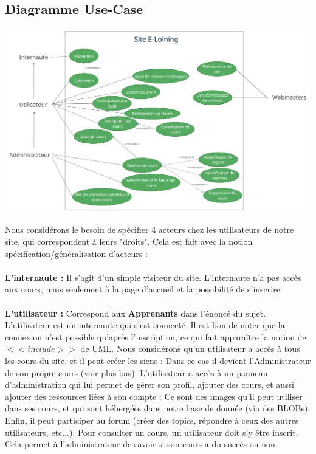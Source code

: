 \documentclass[a4paper,11pt]{article}
\begin{document}
\subsection{Diagramme Use-Case}
\centerline{
    \includegraphics[width=19cm]{images/UseCase.png}
}
Nous considérons le besoin de spécifier 4 acteurs chez les utilisateurs de notre site, qui correspondent à leurs "droits". Cela est fait avec la notion spécification/généralisation d'acteurs :\\\\

\textbf{L'internaute :} Il s'agit d'un simple visiteur du site. L'internaute n'a pas accès aux cours, mais seulement à la page d'accueil et la possibilité de s'inscrire.\\\\

\textbf{L'utilisateur :} Correspond aux \textbf{Apprenants} dans l'énoncé du sujet. L'utilisateur est un internaute qui s'est connecté. Il est bon de noter que la connexion n'est possible qu'après l'inscription, ce qui fait apparaître la notion de $<<include>>$ de UML. Nous considérons qu'un utilisateur a accès à tous les cours du site, et il peut créer les siens : Dans ce cas il devient l'Administrateur de son propre cours (voir plus bas).
L'utilisateur a accès à un panneau d'administration qui lui permet de gérer son profil, ajouter des cours, et aussi ajouter des ressources liées à son compte : Ce sont des images qu'il peut utiliser dans ses cours, et qui sont hébergées dans notre base de donnée (via des BLOBs). Enfin, il peut participer au forum (créer des topics, répondre à ceux des autres utilisateurs, etc...).
Pour consulter un cours, un utilisateur doit s'y être inscrit. Cela permet à l'administrateur de savoir si son cours a du succès ou non.\\\\
\end{document}
